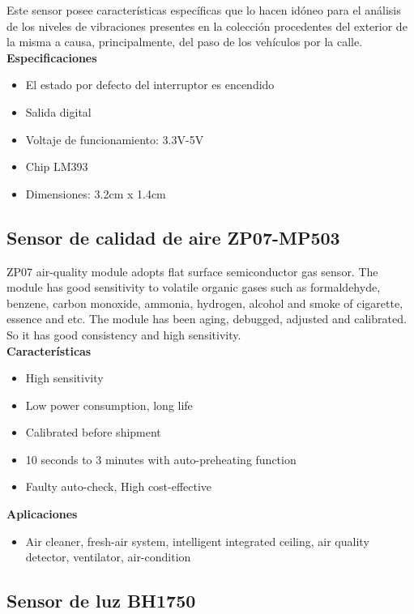 Este sensor posee características específicas que lo hacen idóneo para el análisis de los niveles de vibraciones presentes en la colección procedentes del exterior de la misma a causa, principalmente, del paso de los vehículos por la calle.\\

\textbf{Especificaciones}
\begin{itemize}
    \item El estado por defecto del interruptor es encendido
    \item Salida digital
    \item Voltaje de funcionamiento: 3.3V-5V
    \item Chip LM393
    \item Dimensiones: 3.2cm x 1.4cm
\end{itemize}

\subsection{Sensor de calidad de aire ZP07-MP503}

ZP07 air-quality module adopts flat surface semiconductor gas sensor. The module has good sensitivity to volatile organic gases such as formaldehyde, benzene, carbon
monoxide, ammonia, hydrogen, alcohol and smoke of cigarette, essence and etc. The module has been aging, debugged, adjusted and calibrated. So it has good consistency and high sensitivity.\\

\textbf{Características}
\begin{itemize}
    \item High sensitivity
    \item Low power consumption, long life
    \item Calibrated before shipment
    \item 10 seconds to 3 minutes with auto-preheating function
    \item Faulty auto-check, High cost-effective
\end{itemize}

\textbf{Aplicaciones}
\begin{itemize}
    \item Air cleaner, fresh-air system, intelligent integrated ceiling, air quality detector, ventilator, air-condition
\end{itemize}


\subsection{Sensor de luz BH1750}

